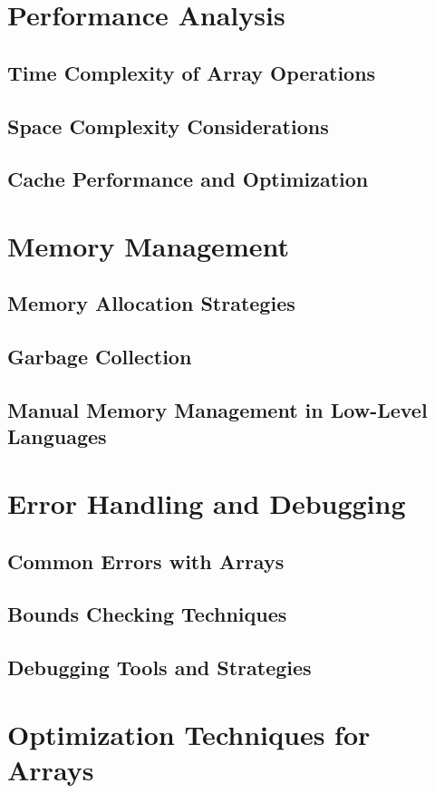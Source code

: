 \documentclass[12pt, oneside]{book}
\begin{document}
\chapter{Performance Analysis}
\section{Time Complexity of Array Operations}
\section{Space Complexity Considerations}
\section{Cache Performance and Optimization}

\chapter{Memory Management}
\section{Memory Allocation Strategies}
\section{Garbage Collection}
\section{Manual Memory Management in Low-Level Languages}

\chapter{Error Handling and Debugging}
\section{Common Errors with Arrays}
\section{Bounds Checking Techniques}
\section{Debugging Tools and Strategies}

\chapter{Optimization Techniques for Arrays}
\end{document}
